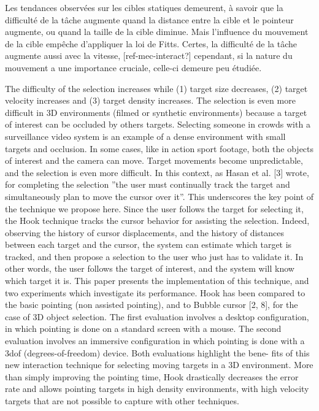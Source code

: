     Les tendances observées sur les cibles statiques demeurent, à savoir que la difficulté de la tâche augmente quand la distance entre la cible et le pointeur augmente, ou quand la taille de la cible diminue. Mais l'influence du mouvement de la cible empêche d'appliquer la loi de Fitts. Certes, la difficulté de la tâche augmente aussi avec la vitesse, [ref-mec-interact?] cependant, si la nature du mouvement a une importance cruciale, celle-ci demeure peu étudiée.
    
    
    
    
 The
difficulty of the selection increases while (1) target size decreases,
(2) target velocity increases and (3) target density increases. The
selection is even more difficult in 3D environments (filmed or synthetic
environments) because a target of interest can be occluded
by others targets. Selecting someone in crowds with a surveillance
video system is an example of a dense environment with small targets
and occlusion. In some cases, like in action sport footage, both
the objects of interest and the camera can move. Target movements
become unpredictable, and the selection is even more difficult.
In this context, as Hasan et al. [3] wrote, for completing the
selection ”the user must continually track the target and simultaneously
plan to move the cursor over it”. This underscores the key
point of the technique we propose here. Since the user follows the
target for selecting it, the Hook technique tracks the cursor behavior
for assisting the selection. Indeed, observing the history of cursor
displacements, and the history of distances between each target and
the cursor, the system can estimate which target is tracked, and then
propose a selection to the user who just has to validate it. In other
words, the user follows the target of interest, and the system will
know which target it is.
This paper presents the implementation of this technique, and
two experiments which investigate its performance. Hook has been
compared to the basic pointing (non assisted pointing), and to Bubble
cursor [2, 8], for the case of 3D object selection. The first evaluation
involves a desktop configuration, in which pointing is done
on a standard screen with a mouse. The second evaluation involves
an immersive configuration in which pointing is done with a 3dof
(degrees-of-freedom) device. Both evaluations highlight the bene-
fits of this new interaction technique for selecting moving targets in
a 3D environment. More than simply improving the pointing time,
Hook drastically decreases the error rate and allows pointing targets
in high density environments, with high velocity targets that are not
possible to capture with other techniques.


	
		

\clearpage
